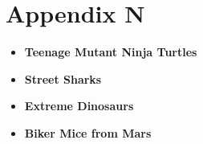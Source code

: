 \documentclass{book}
\begin{document}
\newpage













\chapter*{Appendix N}
\begin{itemize}
    \item \textbf{Teenage Mutant Ninja Turtles}
    \item \textbf{Street Sharks}
    \item \textbf{Extreme Dinosaurs}
    \item \textbf{Biker Mice from Mars}
\end{itemize}
\end{document}
